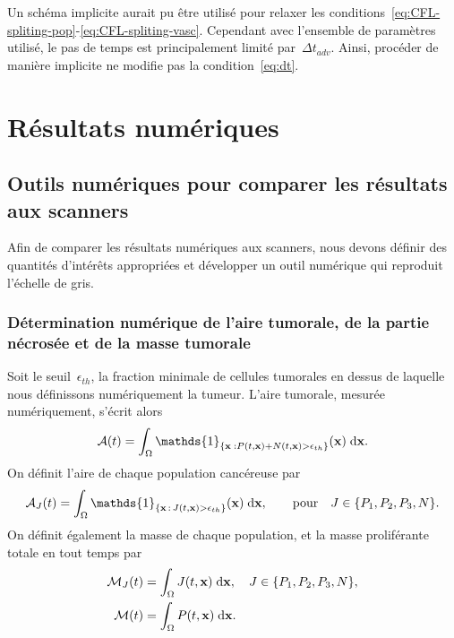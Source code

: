 \documentclass[main.tex]{subfiles}
\begin{document}
Un schéma implicite aurait pu être utilisé pour relaxer les conditions~\eqref{eq:CFL-spliting-pop}-\eqref{eq:CFL-spliting-vasc}. 
Cependant avec l'ensemble de paramètres utilisé, le pas de temps est principalement limité par~$\Delta t_{adv}$. Ainsi, procéder de manière implicite ne modifie pas la condition~\eqref{eq:dt}.

\section{Résultats numériques}\label{sec:NumRes}

\subsection{Outils numériques pour comparer les résultats aux scanners}

Afin de comparer les résultats numériques aux scanners, nous devons définir des quantités d'intérêts appropriées et 
développer un outil numérique qui reproduit l'échelle de gris. 
\subsubsection{Détermination numérique de l'aire tumorale, de la partie nécrosée et de la masse tumorale}

Soit le seuil~$\epsilon_{th}$, la fraction minimale de cellules tumorales en dessus de laquelle nous définissons numériquement la tumeur. 
L'aire tumorale, mesurée numériquement, s'écrit alors
\begin{equation}
\label{eq:airetot}
\mathcal{A}(t)=\int_\Omega \mathds{1}_{\{\vecx\;: P(t,\vecx)+N(t,\vecx) >\epsilon_{th}\}}(\vecx)\textrm{\;d}\vecx.
\end{equation}
On définit l'aire de chaque population cancéreuse par
\begin{equation}
\mathcal{A}_J(t)=\int_\Omega
\mathds{1}_{\{\vecx\,:\,J(t,\vecx)>\epsilon_{th}\}}(\vecx)\textrm{\;d}\vecx,
\qquad \text{pour}\quad J \in \{P_1,P_2,P_3,N \}.
\label{eq:airepop}
\end{equation}
On définit également la masse de chaque population, et la masse proliférante totale en tout temps par 
\begin{align}
\mathcal{M}_J(t)&=\int_\Omega J(t,\mathbf{x}) \textrm{\;d}\mathbf{x}, \quad J \in \{P_1,P_2,P_3,N \},
\label{eq:masspop} \\
\mathcal{M}(t)&=\int_\Omega P 
(t,\mathbf{x})\textrm{\;d}\mathbf{x}.
\label{eq:masstot}
\end{align}
\end{document}
